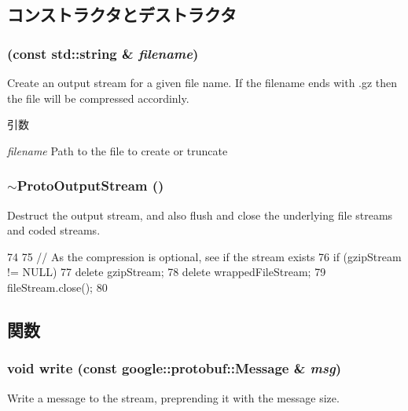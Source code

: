 \subsection{コンストラクタとデストラクタ}
\hypertarget{classProtoOutputStream_a346f0950b2f8e1b86d25628d4ec21420}{
\subsubsection[{ProtoOutputStream}]{ (const std::string \& {\em filename})}}
\label{classProtoOutputStream_a346f0950b2f8e1b86d25628d4ec21420}
Create an output stream for a given file name. If the filename ends with .gz then the file will be compressed accordinly.


\begin{DoxyParams}{引数}
\item[{\em filename}]Path to the file to create or truncate \end{DoxyParams}
\hypertarget{classProtoOutputStream_a158b44af3e3b5991f9d98c92700faa88}{
\subsubsection[{$\sim$ProtoOutputStream}]{\setlength{\rightskip}{0pt plus 5cm}$\sim${\bf ProtoOutputStream} ()}}
\label{classProtoOutputStream_a158b44af3e3b5991f9d98c92700faa88}
Destruct the output stream, and also flush and close the underlying file streams and coded streams. 


\begin{DoxyCode}
74 {
75     // As the compression is optional, see if the stream exists
76     if (gzipStream != NULL)
77         delete gzipStream;
78     delete wrappedFileStream;
79     fileStream.close();
80 }
\end{DoxyCode}


\subsection{関数}
\hypertarget{classProtoOutputStream_ae87c10d7923fb2245ff05bb305ec27ae}{
\subsubsection[{write}]{\setlength{\rightskip}{0pt plus 5cm}void write (const google::protobuf::Message \& {\em msg})}}
\label{classProtoOutputStream_ae87c10d7923fb2245ff05bb305ec27ae}
Write a message to the stream, preprending it with the message size.


